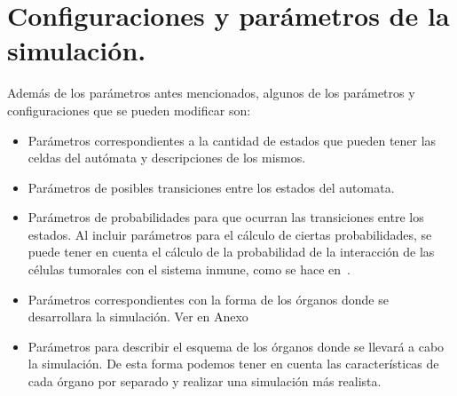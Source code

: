 
\section{Configuraciones y par\'ametros de la simulaci\'on.}

Adem\'as de los par\'ametros antes mencionados, algunos de los par\'ametros y configuraciones que se pueden modificar son:
\begin{itemize}
    \item Par\'ametros correspondientes a la cantidad de estados que pueden tener las celdas del aut\'omata y descripciones de los mismos.
    \item Par\'ametros de posibles transiciones entre los estados del automata.
    \item Par\'ametros de probabilidades para que ocurran las transiciones entre los estados. Al incluir par\'ametros para el c\'alculo de ciertas probabilidades, se puede tener en cuenta el c\'alculo de la probabilidad de la interacci\'on de las c\'elulas tumorales con el sistema inmune, como se hace en~\cite{ruanxiaoca}.
    \item Par\'ametros correspondientes con la forma de los \'organos donde se desarrollara la simulaci\'on. Ver en Anexo %
    \item Par\'ametros para describir el esquema de los \'organos donde se llevar\'a a cabo la simulaci\'on. De esta forma podemos tener en cuenta las caracter\'isticas de cada \'organo por separado y realizar una simulaci\'on m\'as realista.
\end{itemize}

